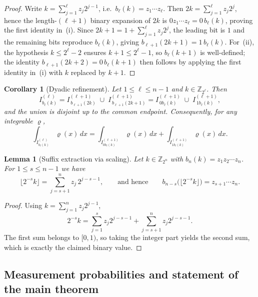 \documentclass{article}
\newtheorem{corollary}[theorem]{Corollary}
\newtheorem{lemma}[theorem]{Lemma}
\numberwithin{equation}{section}
\begin{document}
\begin{proof}
Write $k=\sum_{j=1}^\ell z_j2^{j-1}$, i.e.\ $b_\ell(k)=z_1\cdots z_\ell$.
Then $2k=\sum_{j=1}^\ell z_j2^{j}$, hence the length-$(\ell+1)$ binary expansion of
$2k$ is $0z_1\cdots z_\ell=0\,b_\ell(k)$, proving the first identity in~(i).
Since $2k+1=1+\sum_{j=1}^\ell z_j2^{j}$, the leading bit is $1$ and the remaining
bits reproduce $b_\ell(k)$, giving $b_{\ell+1}(2k+1)=1\,b_\ell(k)$.
For~(ii), the hypothesis $k\le 2^\ell-2$ ensures $k+1\le 2^\ell-1$, so $b_\ell(k+1)$
is well-defined; the identity $b_{\ell+1}(2k+2)=0\,b_\ell(k+1)$ then follows by
applying the first identity in~(i) with $k$ replaced by $k+1$.
\end{proof}

\begin{corollary}[Dyadic refinement]\label{cor:dyadic-refinement}
Let $1\le \ell\le n-1$ and $k\in \mathbb{Z}_{2^{\ell}}$. Then
\[
I^{(\ell)}_{b_\ell(k)}
=
I^{(\ell+1)}_{\,b_{\ell+1}(2k)}\;\cup\; I^{(\ell+1)}_{\,b_{\ell+1}(2k+1)}
=
I^{(\ell+1)}_{\,0b_\ell(k)}\;\cup\; I^{(\ell+1)}_{\,1b_\ell(k)},
\]
and the union is disjoint up to the common endpoint.
Consequently, for any integrable $\varrho$,
\[
\int_{I^{(\ell)}_{b_\ell(k)}}\varrho(x)\,dx
=
\int_{I^{(\ell+1)}_{0b_\ell(k)}}\varrho(x)\,dx
+
\int_{I^{(\ell+1)}_{1b_\ell(k)}}\varrho(x)\,dx.
\]
\end{corollary}

\begin{lemma}[Suffix extraction via scaling]\label{lem:suffix-extraction}
Let $k\in \mathbb{Z}_{2^n}$ with $b_n(k)=z_1z_2\cdots z_n$.
For $1\le s\le n-1$ we have
\[
\Big\lfloor 2^{-s}k\Big\rfloor
=
\sum_{j=s+1}^n z_j\,2^{j-s-1},
\qquad\text{and hence}\qquad
b_{n-s}\!\Big(\lfloor 2^{-s}k\rfloor\Big)=z_{s+1}\cdots z_n.
\]
\end{lemma}

\begin{proof}
Using $k=\sum_{j=1}^n z_j2^{j-1}$,
\[
2^{-s}k=\sum_{j=1}^s z_j2^{j-s-1}+\sum_{j=s+1}^n z_j2^{j-s-1}.
\]
The first sum belongs to $[0,1)$, so taking the integer part yields the second sum,
which is exactly the claimed binary value.
\end{proof}

\subsection{Measurement probabilities and statement of the main theorem}\label{subsec:born-main}
\end{document}
